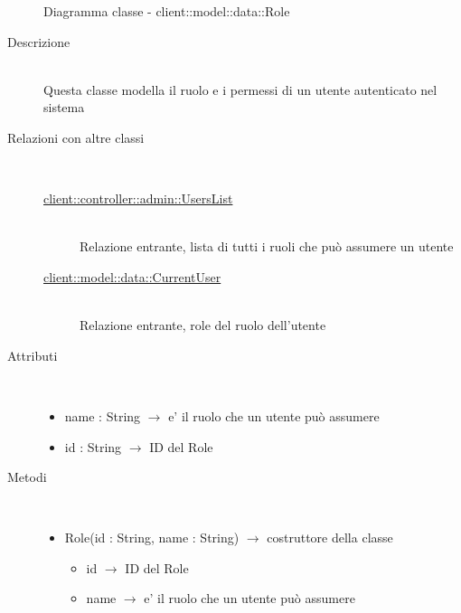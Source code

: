 \vspace{0.5cm}
\hypertarget{client::model::data::Role}{}
\begin{figure}[H]
	\centering
	\caption{Diagramma classe - client::model::data::Role}
\end{figure}\begin{description}
\item[Descrizione] \hfill \\
Questa classe modella il ruolo e i permessi di un utente autenticato nel sistema
\item[Relazioni con altre classi] \hfill \\
\vspace{-7mm}
\begin{description}
	\item[\hyperlink{client::controller::admin::UsersList}{client::controller::admin::UsersList}] \hfill \\
	Relazione entrante, lista di tutti i ruoli che può assumere un utente
	\item[\hyperlink{client::model::data::CurrentUser}{client::model::data::CurrentUser}] \hfill \\
	Relazione entrante, role del ruolo dell'utente
\end{description}

\item[Attributi] \hfill \\
\vspace{-7mm}
\begin{itemize}
	\item name : String $\rightarrow$ e' il ruolo che un utente può assumere
	\item id : String $\rightarrow$ ID del Role
\end{itemize}

\item[Metodi] \hfill \\
\vspace{-7mm}
\begin{itemize}
	\item Role(id : String, name : String) $\rightarrow$ costruttore della classe\begin{itemize}
		\item id $\rightarrow$ ID del Role
		\item name $\rightarrow$ e' il ruolo che un utente può assumere
	\end{itemize}
	

\end{itemize}
\end{description}
